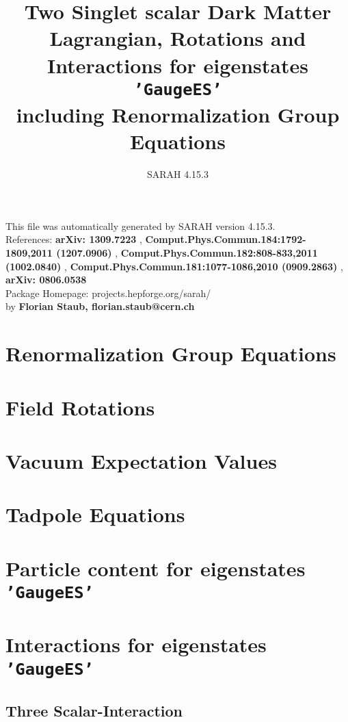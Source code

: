 \documentclass[A4]{article}
\begin{document}
\title{Two Singlet scalar Dark Matter\\ Lagrangian, Rotations and Interactions for eigenstates {\tt'GaugeES'} \\ including Renormalization Group Equations \\ 
} 
\author{SARAH 4.15.3} 
 \maketitle 
 \vspace{10cm} 
This file was automatically generated by SARAH version 4.15.3.  \\ 
References: {\bf arXiv: 1309.7223 }, {\bf Comput.Phys.Commun.184:1792-1809,2011 (1207.0906) }, {\bf Comput.Phys.Commun.182:808-833,2011 (1002.0840) }, {\bf Comput.Phys.Commun.181:1077-1086,2010 (0909.2863) }, {\bf arXiv: 0806.0538 } \\ 
Package Homepage: projects.hepforge.org/sarah/ \\ 
by {\bf Florian Staub, florian.staub@cern.ch} 
 \pagebreak 
 \tableofcontents 
 \pagebreak 
 \allowdisplaybreaks 

\section{Renormalization Group Equations}
 
\section{Field Rotations}
 
 
 
\section{Vacuum Expectation Values}
 
\section{Tadpole Equations}
 
\section{Particle content for eigenstates {\tt 'GaugeES'}}
 
\section{Interactions for eigenstates {\tt 'GaugeES'}}
\subsection{Three Scalar-Interaction}

\end{document}
